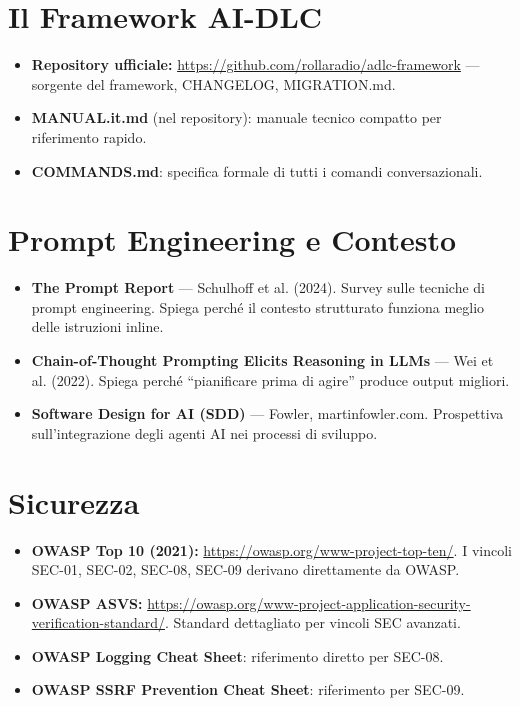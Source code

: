 \section*{Il Framework AI-DLC}

\begin{itemize}
  \item \textbf{Repository ufficiale:} \url{https://github.com/rollaradio/adlc-framework} --- sorgente del framework, CHANGELOG, MIGRATION.md.
  \item \textbf{MANUAL.it.md} (nel repository): manuale tecnico compatto per riferimento rapido.
  \item \textbf{COMMANDS.md}: specifica formale di tutti i comandi conversazionali.
\end{itemize}

\section*{Prompt Engineering e Contesto}

\begin{itemize}
  \item \textbf{The Prompt Report} --- Schulhoff et al. (2024). Survey sulle tecniche di prompt engineering. Spiega perché il contesto strutturato funziona meglio delle istruzioni inline.
  \item \textbf{Chain-of-Thought Prompting Elicits Reasoning in LLMs} --- Wei et al. (2022). Spiega perché ``pianificare prima di agire'' produce output migliori.
  \item \textbf{Software Design for AI (SDD)} --- Fowler, martinfowler.com. Prospettiva sull'integrazione degli agenti AI nei processi di sviluppo.
\end{itemize}

\section*{Sicurezza}

\begin{itemize}
  \item \textbf{OWASP Top 10 (2021):} \url{https://owasp.org/www-project-top-ten/}. I vincoli SEC-01, SEC-02, SEC-08, SEC-09 derivano direttamente da OWASP.
  \item \textbf{OWASP ASVS:} \url{https://owasp.org/www-project-application-security-verification-standard/}. Standard dettagliato per vincoli SEC avanzati.
  \item \textbf{OWASP Logging Cheat Sheet}: riferimento diretto per SEC-08.
  \item \textbf{OWASP SSRF Prevention Cheat Sheet}: riferimento per SEC-09.
\end{itemize}

